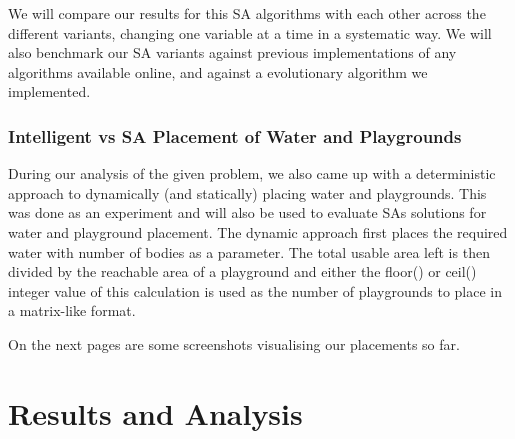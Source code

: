 \documentclass{article}
\begin{document}
We will compare our results for this SA algorithms with each other across the different variants, changing one variable at a time in a systematic way. We will also benchmark our SA variants against previous implementations of any algorithms available online, and against a evolutionary algorithm we implemented.

\subsubsection{Intelligent vs SA Placement of Water and Playgrounds} %

During our analysis of the given problem, we also came up with a deterministic approach to dynamically (and statically) placing water and playgrounds. This was done as an experiment and will also be used to evaluate SAs solutions for water and playground placement. The dynamic approach first places the required water with number of bodies as a parameter. The total usable area left is then divided by the reachable area of a playground and either the floor() or ceil() integer value of this calculation is used as the number of playgrounds to place in a matrix-like format.

On the next pages are some screenshots visualising our placements so far.

\section{Results and Analysis}

\subsection{}
\end{document}
